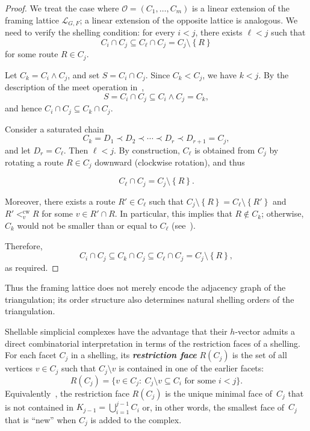 \documentclass[12pt, reqno]{amsart}
\newcommand{\defn}[1]{{\color{blue!50!black}\textbf{\emph{#1}}}}
\newcommand{\set}[1]{\left\lbrace#1\right\rbrace}
\theoremstyle{plain}
\theoremstyle{definition}
\numberwithin{equation}{section}
\begin{document}
\begin{proof}
    We treat the case where $\mathscr{O}=(C_1,\ldots, C_m)$ is a linear extension of the framing lattice $\mathscr{L}_{G,F}$; a linear extension of the opposite lattice is analogous. We need to verify the shelling condition: for every $i<j$, there exists $\ell<j$ such that
    \[
        C_i\cap C_j \subseteq C_\ell\cap C_j = C_j\setminus \set{R}
    \]
    for some route $R\in C_j$.

    Let $C_{k} = C_i \wedge C_j$, and set $S = C_i \cap C_j$. Since $C_{k} < C_j$, we have $k < j$. By the description of the meet operation in~\cite[Proposition~1.3.7 and Theorem~1.3.8]{vonBell_framing_2024},
    \[
        S = C_i \cap C_j \subseteq C_i \wedge C_j = C_{k},
    \]
    and hence $C_i \cap C_j \subseteq C_{k} \cap C_j$.

    Consider a saturated chain
    \[
        C_{k} = D_1 \prec D_2 \prec \cdots \prec D_r \prec D_{r+1} = C_j,
    \]
    and let $D_r = C_\ell$. Then $\ell < j$. By construction, $C_\ell$ is obtained from $C_j$ by rotating a route $R \in C_j$ downward (clockwise rotation), and thus
    
    \[
        C_\ell \cap C_j = C_j \setminus \set{R}.
    \]

    Moreover, there exists a route $R' \in C_\ell$ such that $C_j \setminus \set{R} = C_\ell \setminus \set{R'}$ and $R' <^{\mathrm{cw}}_v R$ for some $v \in R' \cap R$. In particular, this implies that $R \notin C_k$; otherwise, $C_k$ would not be smaller than or equal to $C_\ell$ (see~\cite[Theorem~1.2.15]{vonBell_framing_2024}).

    Therefore,
    \[
        C_i \cap C_j \subseteq C_{k} \cap C_j \subseteq C_\ell \cap C_j = C_j \setminus \set{R},
    \]
    as required.
\end{proof}


Thus the framing lattice does not merely encode the adjacency graph of the triangulation; its order structure also determines natural shelling orders of the triangulation.

Shellable simplicial complexes have the advantage that their $h$-vector admits a direct combinatorial interpretation in terms of the restriction faces of a shelling. For each facet $C_j$ in a shelling, its \defn{restriction face} $R(C_j)$ is the set of all vertices $v \in C_j$ such that $C_j\setminus v$ is contained in one of the earlier facets:
\[
R(C_j)=\{
v\in C_j:\ C_j\setminus v \subseteq C_i \text{ for some } i<j 
\}.
\]
Equivalently~\cite[Section~8.3]{ziegler_lectures_1995}, the restriction face $R(C_j)$ is the unique minimal face of~$C_j$ that is not contained in $K_{j-1} = \bigcup_{i=1}^{j-1} C_i$ or, in other words, the smallest face of~$C_j$ that is ``new'' when $C_j$ is added to the complex.
\end{document}
